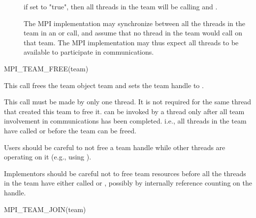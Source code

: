 \begin{description}
\item[] if set to "true", then all threads in the team will
be calling
 and
.

The MPI implementation may synchronize between all the threads in the
team in an
 or
 call, and assume that
no thread in the team would call
on that team. The
MPI implementation may thus expect all threads to be available to
participate in communications.
\end{description}

\begin{funcdef}{MPI\_TEAM\_FREE(team)}
\end{funcdef}



This call frees the team object team and sets the team handle to
.

This call must be made by only one thread. It is not required for the
same thread that created this team to free it.
 can
be invoked by a thread only after all team involvement in communications
has been completed.
i.e.,
all threads in the team have called 
 or
before the team can be freed.

\begin{users}
Users should be careful to not free a team handle while other threads
are operating on it (e.g., using
).
\end{users}

\begin{implementors}
Implementors should be careful not to free team resources before
all the threads in the team have either called
 or
,
possibly by internally reference counting on the handle.
\end{implementors}

\begin{funcdef}{MPI\_TEAM\_JOIN(team)}
\end{funcdef}


